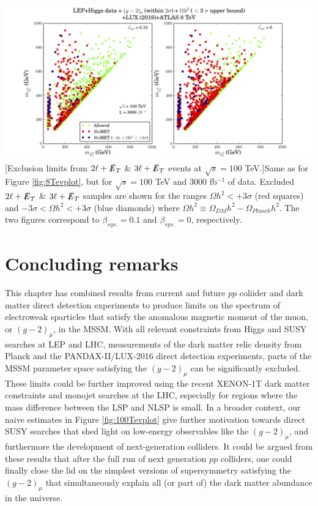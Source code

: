 \begin{center}
	\includegraphics[scale=0.5]{figures/plot100TeV.png}
	[Exclusion limits from $2\ell+\slashed{E}_T$ \& $3\ell+\slashed{E}_T$ events at $\sqrt{s}=100$ TeV.]{Same as for Figure \ref{fig:8Tevplot}, but for $\sqrt{s}=100$ TeV and 3000 fb$^{-1}$ of data. Excluded $2\ell+\slashed{E}_T$ \& $3\ell+\slashed{E}_T$ samples are shown for the ranges $\Omega h^2<+3\sigma$ (red squares) and $-3\sigma <\Omega h^2<+3\sigma$ (blue diamonds) where $\Omega h^2 \equiv \Omega_{DM} h^2 - \Omega_{Planck} h^2$. The two figures correspond to $\beta_{sys.}=0.1$ and $\beta_{sys.}=0$, respectively.}
	\label{fig:100Tevplot}
\end{center}

\section{Concluding remarks}

This chapter has combined results from current and future $pp$ coliider and dark matter direct detection experiments to produce limits on the spectrum of electroweak sparticles that satisfy the anomalous magnetic moment of the muon, or $(g-2)_{\mu}$, in the MSSM. With all relevant constraints from Higgs and SUSY searches at LEP and LHC, measurements of the dark matter relic density from Planck and the PANDAX-II/LUX-2016 direct detection experiments, parts of the MSSM parameter space satisfying the $(g-2)_{\mu}$ can be significantly excluded. These limits could be further improved using the recent XENON-1T \cite{RN606,RN770} dark matter constraints and monojet searches \cite{RN196} at the LHC, especially for regions where the mass difference between the LSP and NLSP is small. In a broader context, our naive estimates in Figure \ref{fig:100Tevplot} give further motivation towards direct SUSY searches that shed light on low-energy observables like the $(g-2)_{\mu}$, and furthermore the development of next-generation colliders. It could be argued from these results that after the full run of next generation $pp$ colliders, one could finally close the lid on the simplest versions of supersymmetry satisfying the $(g-2)_{\mu}$ that simultaneously explain all (or part of) the dark matter abundance in the universe.

